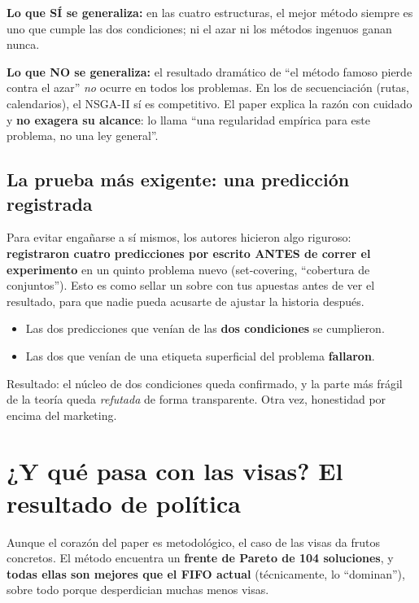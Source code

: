 \documentclass[11pt]{article}
\newcommand{\term}[1]{\textbf{\color{acento}#1}}
\begin{document}
\textbf{Lo que SÍ se generaliza:} en las cuatro estructuras, el mejor método siempre es uno que cumple las dos condiciones; ni el azar ni los métodos ingenuos ganan nunca.

\textbf{Lo que NO se generaliza:} el resultado dramático de ``el método famoso pierde contra el azar'' \emph{no} ocurre en todos los problemas. En los de secuenciación (rutas, calendarios), el NSGA-II sí es competitivo. El paper explica la razón con cuidado y \textbf{no exagera su alcance}: lo llama ``una regularidad empírica para este problema, no una ley general''.

\subsection{La prueba más exigente: una predicción registrada}

Para evitar engañarse a sí mismos, los autores hicieron algo riguroso: \term{registraron cuatro predicciones por escrito ANTES de correr el experimento} en un quinto problema nuevo (set-covering, ``cobertura de conjuntos''). Esto es como sellar un sobre con tus apuestas antes de ver el resultado, para que nadie pueda acusarte de ajustar la historia después.

\begin{itemize}[leftmargin=1.4em]
  \item Las dos predicciones que venían de las \textbf{dos condiciones} se cumplieron.
  \item Las dos que venían de una etiqueta superficial del problema \textbf{fallaron}.
\end{itemize}

Resultado: el núcleo de dos condiciones queda confirmado, y la parte más frágil de la teoría queda \emph{refutada} de forma transparente. Otra vez, honestidad por encima del marketing.

\section{¿Y qué pasa con las visas? El resultado de política}

Aunque el corazón del paper es metodológico, el caso de las visas da frutos concretos. El método encuentra un \term{frente de Pareto de 104 soluciones}, y \textbf{todas ellas son mejores que el FIFO actual} (técnicamente, lo ``dominan''), sobre todo porque desperdician muchas menos visas.
\end{document}
